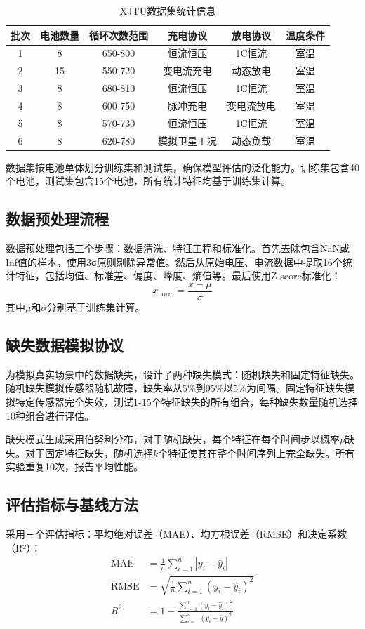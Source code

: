 \documentclass{ctexart}
\begin{document}
\begin{table}[htbp]
\centering
\caption{XJTU数据集统计信息}
\label{tab:dataset}
\begin{tabular}{cccccc}
\toprule
批次 & 电池数量 & 循环次数范围 & 充电协议 & 放电协议 & 温度条件 \\
\midrule
1 & 8 & 650-800 & 恒流恒压 & 1C恒流 & 室温 \\
2 & 15 & 550-720 & 变电流充电 & 动态放电 & 室温 \\
3 & 8 & 680-810 & 恒流恒压 & 1C恒流 & 室温 \\
4 & 8 & 600-750 & 脉冲充电 & 变电流放电 & 室温 \\
5 & 8 & 570-730 & 恒流恒压 & 1C恒流 & 室温 \\
6 & 8 & 620-780 & 模拟卫星工况 & 动态负载 & 室温 \\
\bottomrule
\end{tabular}
\end{table}

数据集按电池单体划分训练集和测试集，确保模型评估的泛化能力。训练集包含40个电池，测试集包含15个电池，所有统计特征均基于训练集计算。

\subsection{数据预处理流程}
数据预处理包括三个步骤：数据清洗、特征工程和标准化。首先去除包含NaN或Inf值的样本，使用3σ原则剔除异常值。然后从原始电压、电流数据中提取16个统计特征，包括均值、标准差、偏度、峰度、熵值等。最后使用Z-score标准化：
\begin{equation}
x_{\text{norm}} = \frac{x - \mu}{\sigma}
\end{equation}
其中$\mu$和$\sigma$分别基于训练集计算。

\subsection{缺失数据模拟协议}
为模拟真实场景中的数据缺失，设计了两种缺失模式：随机缺失和固定特征缺失。随机缺失模拟传感器随机故障，缺失率从5\%到95\%以5\%为间隔。固定特征缺失模拟特定传感器完全失效，测试1-15个特征缺失的所有组合，每种缺失数量随机选择10种组合进行评估。

缺失模式生成采用伯努利分布，对于随机缺失，每个特征在每个时间步以概率$p$缺失。对于固定特征缺失，随机选择$k$个特征使其在整个时间序列上完全缺失。所有实验重复10次，报告平均性能。

\subsection{评估指标与基线方法}
采用三个评估指标：平均绝对误差（MAE）、均方根误差（RMSE）和决定系数（R²）：
\begin{align}
\text{MAE} &= \frac{1}{n}\sum_{i=1}^{n}|y_i - \hat{y}_i| \\
\text{RMSE} &= \sqrt{\frac{1}{n}\sum_{i=1}^{n}(y_i - \hat{y}_i)^2} \\
R^2 &= 1 - \frac{\sum_{i=1}^{n}(y_i - \hat{y}_i)^2}{\sum_{i=1}^{n}(y_i - \bar{y})^2}
\end{align}
\end{document}
